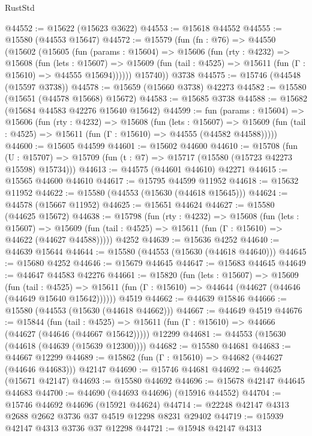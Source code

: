 \begin{lexlean}{RustStd}
\begin{coremodule}
@44552 := @15622 (@15623 @3622)
@44553 := @15618 @44552
@44555 := @15580 (@44553 @15647)
@44572 := @15579
    (fun (fn : @76) =>
    @44550
      (@15602
        (@15605
          (fun (params : @15604) =>
          @15606
            (fun (rty : @4232) =>
            @15608
              (fun (lets : @15607) =>
              @15609 (fun (tail : @4525) => @15611 (fun (Γ : @15610) => @44555 @15694))))))
        @15740))
    @3738
@44575 := @15746 (@44548 (@15597 @3738))
@44578 := @15659 (@15660 @3738) @42273
@44582 := @15580 (@15651 (@44578 @15668) @15672)
@44583 := @15685 @3738
@44588 := @15682 (@15684 @44583 @42276 @15640 @15642)
@44599 := fun (params : @15604) =>
  @15606
    (fun (rty : @4232) =>
    @15608
      (fun (lets : @15607) =>
      @15609 (fun (tail : @4525) => @15611 (fun (Γ : @15610) => @44555 (@44582 @44588)))))
@44600 := @15605 @44599
@44601 := @15602 @44600
@44610 := @15708
    (fun (U : @15707) => @15709 (fun (t : @7) => @15717 (@15580 (@15723 @42273 @15598) @15734)))
@44613 := @44575 (@44601 @44610) @42271
@44615 := @15565 @44600 @44610
@44617 := @15795 @44599 @11952
@44618 := @15632 @11952
@44622 := @15580 (@44553 (@15630 (@44618 @15645)))
@44624 := @44578 (@15667 @11952)
@44625 := @15651 @44624
@44627 := @15580 (@44625 @15672)
@44638 := @15798
    (fun (rty : @4232) =>
    @15608
      (fun (lets : @15607) =>
      @15609 (fun (tail : @4525) => @15611 (fun (Γ : @15610) => @44622 (@44627 @44588)))))
    @4252
@44639 := @15636 @4252
@44640 := @44639 @15644
@44644 := @15580 (@44553 (@15630 (@44618 @44640)))
@44645 := @15680 @4252
@44646 := @15679 @44645
@44647 := @15683 @44645
@44649 := @44647 @44583 @42276
@44661 := @15820
    (fun (lets : @15607) =>
    @15609
      (fun (tail : @4525) =>
      @15611 (fun (Γ : @15610) => @44644 (@44627 (@44646 (@44649 @15640 @15642))))))
    @4519
@44662 := @44639 @15846
@44666 := @15580 (@44553 (@15630 (@44618 @44662)))
@44667 := @44649 @4519
@44676 := @15844
    (fun (tail : @4525) => @15611 (fun (Γ : @15610) => @44666 (@44627 (@44646 (@44667 @15642)))))
    @12299
@44681 := @44553 (@15630 (@44618 (@44639 (@15639 @12300))))
@44682 := @15580 @44681
@44683 := @44667 @12299
@44689 := @15862 (fun (Γ : @15610) => @44682 (@44627 (@44646 @44683))) @42147
@44690 := @15746 @44681
@44692 := @44625 (@15671 @42147)
@44693 := @15580 @44692
@44696 := @15678 @42147 @44645 @44683
@44700 := @44690 (@44693 @44696) (@15916 @44552)
@44704 := @15746 @44692 @44696 (@15921 @44624)
@44714 := @22248 @42147 @4313 @2688 @2662 @3736 @37 @4519 @12298 @8231 @29402
@44719 := @15939 @42147 @4313 @3736 @37 @12298
@44721 := @15948 @42147 @4313

\end{coremodule}
\end{lexlean}
